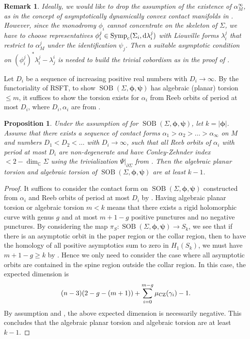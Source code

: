 \documentclass[11pt]{amsart}
\numberwithin{equation}{section}
\newtheorem{proposition}[theorem]{\textbf{Proposition}}
\newtheorem{remark}[theorem]{\textbf{Remark}}
\def\C{{\mathbb C}}
\def\rd{{\rm d}}
\def\CZ{\rm CZ}
\DeclareMathOperator{\symp}{Symp}
\DeclareMathOperator{\SOB}{SOB}
\begin{document}
\begin{remark}
    Ideally, we would like to drop the assumption of the existence of $\alpha_M^{\infty}$, as in the concept of asymptotically dynamically convex contact manifolds in \cite{Lazarev}. However, since the monodromy $\phi_i$ cannot concentrate on the skeleton of $\Sigma$, we have to choose representatives $\phi_i^j\in \symp_c(\Sigma_i,\rd \lambda_i^j)$ with Liouville forms $\lambda_i^j$ that restrict to $\alpha^j_M$ under the identification $\psi_j$. Then a suitable asymptotic condition on $(\phi_i^j)^*\lambda_i^j-\lambda_j^i$ is needed to build the trivial cobordism as in the proof of .
\end{remark}

Let $D_i$ be a sequence of increasing positive real numbers with $D_i\to \infty$. By the functoriality of RSFT, to show $\SOB(\Sigma,\bm{\phi},\bm{\psi})$ has algebraic (planar) torsion $\le m$, it suffices to show the torsion exists for $\alpha_i$ from Reeb orbits of period at most $D_i$, where $D_i,\alpha_i$ are from .

\begin{proposition}\label{prop:lower_bound}
    Under the assumption of  for $\SOB(\Sigma,\bm{\phi},\bm{\psi})$, let $k=|\bm{\phi}|$.
    Assume that there exists a sequence of contact forms $\alpha_1>\alpha_2>\ldots >\alpha_\infty$ on $M$ and numbers $D_1<D_2<\ldots$ with $D_i\to \infty$, such that all Reeb orbits of $\alpha_i$ with period at most $D_i$ are non-degenerate and have Conley-Zehnder index $<2-\dim_{\C}\Sigma$ using the trivialization $\Psi|_{\partial \Sigma}$ from . Then the algebraic planar torsion and algebraic torsion of $\SOB(\Sigma,\bm{\phi},\bm{\psi})$ are at least $k-1$.
\end{proposition}
\begin{proof}
It suffices to consider the contact form on $\SOB(\Sigma,\bm{\phi},\bm{\psi})$ constructed from $\alpha_i$ and Reeb orbits of period at most $D_i$ by . Having algebraic planar torsion or algebraic torsion $m<k$ means that there exists a rigid holomorphic curve with genus $g$ and at most $m+1-g$ positive punctures and no negative punctures. By considering the map $\pi_S:\SOB(\Sigma,\bm{\phi},\bm{\psi})\to S_{k}$, we see that if there is an asymptotic orbit in the paper region or the collar region, then to have the homology of all positive asymptotics sum to zero in $H_1(S_k)$, we must have $m+1-g\ge k$ by . Hence we only need to consider the case where all asymptotic orbits are contained in the spine region outside the collar region. In this case, the expected dimension is 
    $$(n-3)(2-g-(m+1))+\sum_{i=0}^{m-g}\mu_{\CZ}(\gamma_i)-1.$$
By assumption and , the above expected dimension is necessarily negative. This concludes that the algebraic planar torsion and algebraic torsion are at least $k-1$.
\end{proof}
\end{document}
